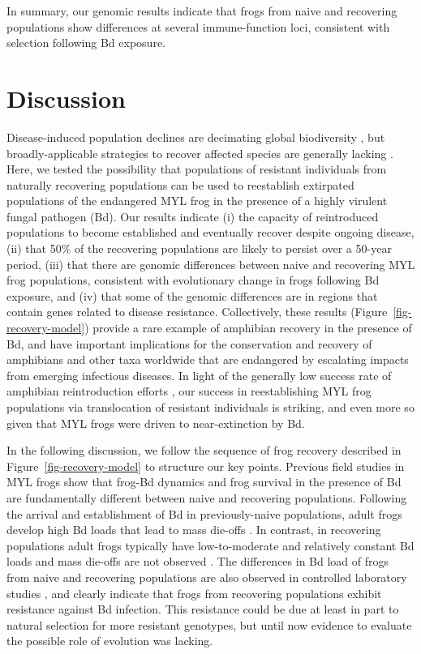 \documentclass[9pt,twocolumn,twoside,lineno]{pnas-new}
\begin{document}
In summary, our genomic results indicate that frogs from naive and
recovering populations show differences at several immune-function loci,
consistent with selection following Bd exposure.

\section*{Discussion}

Disease-induced population declines are decimating global biodiversity
\citep{daszak2000}, but broadly-applicable strategies to recover
affected species are generally lacking \citep[e.g.,][]{garner2016}.
Here, we tested the possibility that populations of resistant
individuals from naturally recovering populations can be used to
reestablish extirpated populations of the endangered MYL frog in the
presence of a highly virulent fungal pathogen (Bd). Our results indicate
(i) the capacity of reintroduced populations to become established and
eventually recover despite ongoing disease, (ii) that 50\% of the
recovering populations are likely to persist over a 50-year period,
(iii) that there are genomic differences between naive and recovering
MYL frog populations, consistent with evolutionary change in frogs
following Bd exposure, and (iv) that some of the genomic differences are
in regions that contain genes related to disease resistance.
Collectively, these results (Figure~\ref{fig-recovery-model}) provide a
rare example of amphibian recovery in the presence of Bd, and have
important implications for the conservation and recovery of amphibians
and other taxa worldwide that are endangered by escalating impacts from
emerging infectious diseases. In light of the generally low success rate
of amphibian reintroduction efforts \citep{dodd2005}, our success in
reestablishing MYL frog populations via translocation of resistant
individuals is striking, and even more so given that MYL frogs were
driven to near-extinction by Bd.

In the following discussion, we follow the sequence of frog recovery
described in Figure~\ref{fig-recovery-model} to structure our key
points. Previous field studies in MYL frogs show that frog-Bd dynamics
and frog survival in the presence of Bd are fundamentally different
between naive and recovering populations. Following the arrival and
establishment of Bd in previously-naive populations, adult frogs develop
high Bd loads that lead to mass die-offs \citep{vredenburg2010}. In
contrast, in recovering populations adult frogs typically have
low-to-moderate and relatively constant Bd loads and mass die-offs are
not observed \citep[see also Figure S2]{briggs2010, knapp2011}. The differences in Bd load of frogs from
naive and recovering populations are also observed in controlled
laboratory studies \citep[see Figure 4 in][]{knapp2016}, and clearly
indicate that frogs from recovering populations exhibit resistance
against Bd infection. This resistance could be due at least in part to
natural selection for more resistant genotypes, but until now evidence
to evaluate the possible role of evolution was lacking.
\end{document}
